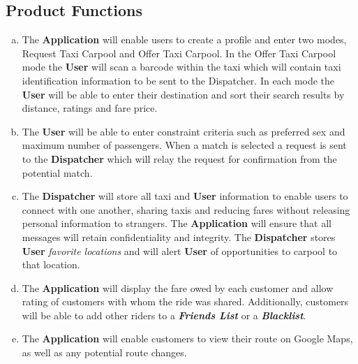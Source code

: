 \documentclass[english]{article}
\begin{document}
\subsection{Product Functions}
\label{sub:product_functions}
\begin{enumerate}[a)]
	\item The \textbf{Application} will enable users to create a profile and enter two modes, Request Taxi Carpool and Offer Taxi Carpool. In the Offer Taxi Carpool mode the \textbf{User} will scan a barcode within the taxi which will contain taxi identification information to be sent to the Dispatcher. In each mode the \textbf{User} will be able to enter their destination and sort their search results by distance, ratings and fare price. 
	
	\item The \textbf{User} will be able to enter constraint criteria such as preferred sex and maximum number of passengers. When a match is selected a request is sent to the \textbf{Dispatcher} which will relay the request for confirmation from the potential match. 
	
	\item The \textbf{Dispatcher} will store all taxi and \textbf{User} information to enable users to connect with one another, sharing taxis and reducing fares without releasing personal information to strangers. The \textbf{Application} will ensure that all messages will retain confidentiality and integrity. The \textbf{Dispatcher} stores \textbf{User} \textit{favorite locations} and will alert \textbf{User} of opportunities to carpool to that location.
	
	\item The \textbf{Application} will display the fare owed by each customer and allow rating of customers with whom the ride was shared. Additionally, customers will be able to add other riders to a \textbf{\emph{Friends List}} or a \textbf{\emph{Blacklist}}.
	
	\item The \textbf{Application} will enable customers to view their route on Google Maps, as well as any potential route changes.
\end{enumerate}
\end{document}
